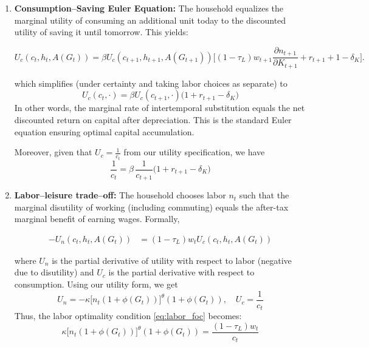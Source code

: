 \begin{enumerate}
  \item \textbf{Consumption–Saving Euler Equation:} The household equalizes the marginal utility of consuming an additional unit today to the discounted utility of saving it until tomorrow. This yields:

    \begin{equation}
    U_c(c_t, h_t, A(G_t)) = \beta U_c(c_{t+1}, h_{t+1}, A(G_{t+1})) \bigl[(1-\tau_L)w_{t+1} \frac{\partial n_{t+1}}{\partial K_{t+1}} + r_{t+1} + 1 - \delta_K\bigr].
    \end{equation}

    which simplifies (under certainty and taking labor choices as separate) to
    \begin{equation}
    U_c(c_t,\cdot) = \beta U_c(c_{t+1},\cdot)\bigl(1 + r_{t+1} - \delta_K\bigr)
    \end{equation}
    In other words, the marginal rate of intertemporal substitution equals the
    net discounted return on capital after depreciation. This is the standard Euler equation ensuring optimal capital accumulation.

    Moreover, given that $U_c = \frac{1}{c_t}$ from our utility specification, we have
    \begin{equation}
        \frac{1}{c_t} = \beta\,\frac{1}{c_{t+1}}\bigl(1+r_{t+1}-\delta_K\bigr) \label{eq:euler}
    \end{equation}


  \item \textbf{Labor--leisure trade–off:} The household chooses labor $n_t$ such that the marginal disutility of working (including commuting) equals the after-tax marginal benefit of earning wages. Formally,

    \begin{align}
    -U_n(c_t, h_t, A(G_t)) &= (1-\tau_L)w_t U_c(c_t, h_t, A(G_t))
    \label{eq:labor_foc}
    \end{align}

    where $U_n$ is the partial derivative of utility with respect to labor (negative due to disutility) and $U_c$ is the partial derivative with respect to consumption. Using our utility form, we get
    \begin{equation}
    U_n = -\kappa \bigl[n_t(1+\phi(G_t))\bigr]^{\theta}(1+\phi(G_t)), \quad U_c = \frac{1}{c_t}
    \end{equation}
    Thus, the labor optimality condition \ref{eq:labor_foc} becomes:
    \begin{equation}
    \kappa \bigl[n_t(1+\phi(G_t))\bigr]^{\theta}(1+\phi(G_t)) = \frac{(1-\tau_L)w_t}{c_t}
    \end{equation}


\end{enumerate}
